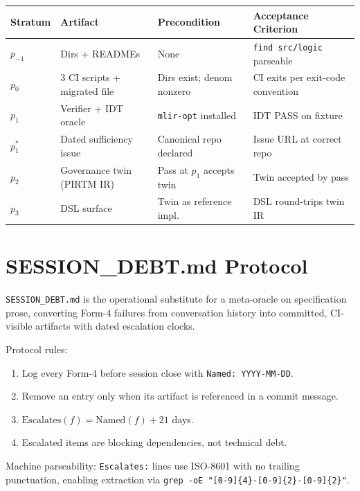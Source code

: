 \documentclass[11pt,letterpaper]{article}
\theoremstyle{pirtmthm}
\theoremstyle{remark}
\begin{document}
\begin{center}
\renewcommand{\arraystretch}{1.35}
\begin{tabular}{@{}>{\bfseries}p{1.3cm}p{3.4cm}p{2.8cm}p{3.5cm}@{}}
  \toprule
  Stratum & Artifact & Precondition & Acceptance Criterion \\
  \midrule
  $p_{-1}$
    & Dirs + READMEs
    & None
    & \texttt{find src/logic} parseable \\
  $p_0$
    & 3 CI scripts + migrated file
    & Dirs exist; denom nonzero
    & CI exits per exit-code convention \\
  $p_1$
    & Verifier + IDT oracle
    & \texttt{mlir-opt} installed
    & IDT PASS on fixture \\
  $p_1^*$
    & Dated sufficiency issue
    & Canonical repo declared
    & Issue URL at correct repo \\
  $p_2$
    & Governance twin (PIRTM IR)
    & Pass at $p_1$ accepts twin
    & Twin accepted by pass \\
  $p_3$
    & DSL surface
    & Twin as reference impl.
    & DSL round-trips twin IR \\
  \bottomrule
\end{tabular}
\end{center}

\section{SESSION\_DEBT.md Protocol}

\texttt{SESSION\_DEBT.md} is the operational substitute for a meta-oracle on
specification prose, converting Form-4 failures from conversation history into
committed, CI-visible artifacts with dated escalation clocks.

Protocol rules:
\begin{enumerate}[leftmargin=1.8em]
  \item Log every Form-4 before session close with \texttt{Named: YYYY-MM-DD}.
  \item Remove an entry only when its artifact is referenced in a commit message.
  \item $\mathrm{Escalates}(f) = \mathrm{Named}(f) + 21$ days.
  \item Escalated items are blocking dependencies, not technical debt.
\end{enumerate}

Machine parseability: \texttt{Escalates:} lines use ISO-8601 with no trailing
punctuation, enabling extraction via
\texttt{grep -oE "[0-9]\{4\}-[0-9]\{2\}-[0-9]\{2\}"}.
\end{document}
